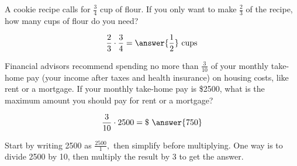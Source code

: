 \documentclass{ximera}[font=12pt]
\begin{document}
\begin{problem}
A cookie recipe calls for $\frac{3}{4}$ cup of flour.  If you only want to make $\frac{2}{3}$ of the recipe, how 
many cups of flour do you need?

\[ \frac{2}{3} \cdot \frac{3}{4} = \answer{\frac{1}{2}} \ \text{cups} \]
\end{problem}


\begin{problem}
Financial advisors recommend spending no more than $\textstyle \frac{3}{10}$ of your monthly take-home pay 
(your income after taxes and health insurance) on housing costs, like rent or a mortgage.  If your monthly 
take-home pay is \$2500, what is the maximum amount you should pay for rent or a mortgage?

\[ \frac{3}{10} \cdot 2500 = \$ \ \answer{750} \]

\begin{hint}
Start by writing 2500 as $\frac{2500}{1},$ then simplify before multiplying.  One way is to divide 2500 by 10, 
then multiply the result by 3 to get the answer.
\end{hint}

\end{problem}
\end{document}
